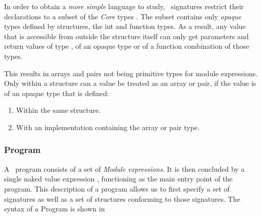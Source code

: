 In order to obtain a \emph{more simple} language to study, \MiniML\ signatures restrict their declarations to a subset  of the \emph{Core} types \cmath{\tau}. 
The subset  contains only \emph{opaque} types defined by structures, the int and function types.
As a result, any value that is accessible from outside the structure itself can only get parameters and return values of type , of an opaque type or of a function combination of those types.

This results in arrays \cmath{[\tau]} and pairs  not being primitive types for module expressions.
Only within a structure can a value be treated as an array or pair, if the value is of an opaque type that is defined:
\begin{enumerate}
\item Within the same structure.
\item With an implementation containing the array or pair type.
\end{enumerate}



\subsubsection{Program}
A \MiniML\ program consists of a set of \emph{Module expressions}.
It is then concluded by a single naked value expression , functioning as the main entry point of the program.
This description of a program allows us to first specify a set of signatures as well as a set of structures conforming to those signatures.
The syntax of a Program is shown in 




